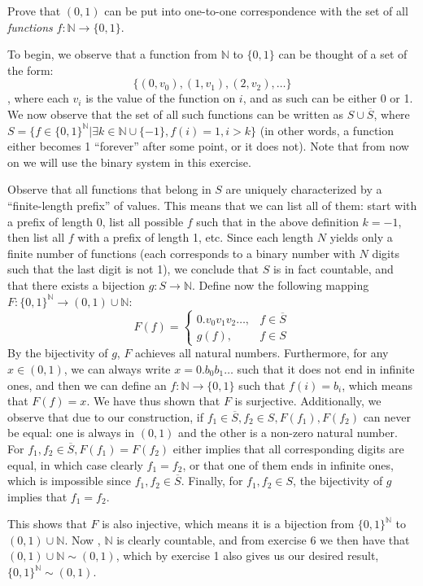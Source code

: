 \begin{exercise}{10}
    Prove that $(0, 1)$ can be put into one-to-one correspondence with the set of all \textit{functions} $f: \mathbb{N} \rightarrow \{0, 1\}$.
\end{exercise}

\begin{solution}

    To begin, we observe that a function from $\mathbb{N}$ to $\{0, 1\}$ can be thought of a set of the form:
    $$\{(0, v_0), (1, v_1), (2, v_2), \ldots \}$$,
    where each $v_i$ is the value of the function on $i$, and as such can be either 0 or 1.
    We now observe that the set of all such functions can be written as $S \cup \overline{S}$, where $S = \{f \in \{0, 1\}^{\mathbb{N}} \lvert \exists k \in \mathbb{N} \cup \{-1\}, f(i) = 1, i > k\}$ (in other words, a function either becomes 1 ``forever'' after some point, or it does not).
    Note that from now on we will use the binary system in this exercise.

    Observe that all functions that belong in $S$ are uniquely characterized by a ``finite-length prefix'' of values.
    This means that we can list all of them: start with a prefix of length 0, list all possible $f$ such that in the above definition $k = -1$, then list all $f$ with a prefix of length 1, etc.
    Since each length $N$ yields only a finite number of functions (each corresponds to a binary number with $N$ digits such that the last digit is not 1), we conclude that $S$ is in fact countable, and that there exists a bijection $g: S \rightarrow \mathbb{N}$.
    Define now the following mapping $F: \{0, 1\}^{\mathbb{N}} \rightarrow (0, 1) \cup \mathbb{N}$:
    $$F(f) = \begin{cases}
        0.v_0v_1v_2\ldots, & f \in \overline{S} \\
        g(f), & f \in S
    \end{cases}$$
    By the bijectivity of $g$, $F$ achieves all natural numbers.
    Furthermore, for any $x \in (0, 1)$, we can always write $x = 0.b_0b_1\ldots$ such that it does not end in infinite ones, and then we can define an $f: \mathbb{N} \rightarrow \{0, 1\}$ such that $f(i) = b_i$, which means that $F(f) = x$.
    We have thus shown that $F$ is surjective.
    Additionally, we observe that due to our construction, if $f_1 \in \overline{S}, f_2 \in S, F(f_1), F(f_2)$ can never be equal: one is always in $(0, 1)$ and the other is a non-zero natural number.
    For $f_1, f_2 \in \overline{S}, F(f_1) = F(f_2)$ either implies that all corresponding digits are equal, in which case clearly $f_1 = f_2$, or that one of them ends in infinite ones, which is impossible since $f_1, f_2 \in \overline{S}$.
    Finally, for $f_1, f_2 \in S$, the bijectivity of $g$ implies that $f_1 = f_2$.

    This shows that $F$ is also injective, which means it is a bijection from $\{0, 1\}^{\mathbb{N}}$ to $(0, 1) \cup \mathbb{N}$.
    Now , $\mathbb{N}$ is clearly countable, and from exercise 6 we then have that $(0, 1) \cup \mathbb{N} \sim (0, 1)$, which by exercise 1 also gives us our desired result, $\{0, 1\}^{\mathbb{N}} \sim (0, 1)$.

\end{solution}

